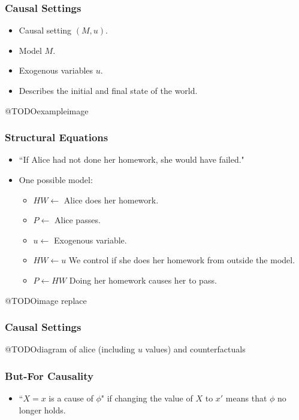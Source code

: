 \documentclass{beamer}
\theoremstyle{plain}
\theoremstyle{definition}
\begin{document}
\begin{frame}
\frametitle{Causal Settings}
\begin{itemize}
\item Causal setting $(M,u)$.
\item Model $M$.
\item Exogenous variables $u$.
\item Describes the initial and final state of the world.

\end{itemize}

@TODOexampleimage


\end{frame}


\begin{frame}
\frametitle{Structural Equations}
\begin{itemize}
\item ``If Alice had not done her homework, she would have failed."
\item One possible model: 
\begin{itemize}
\item $HW \leftarrow$ Alice does her homework.
\item $P \leftarrow$ Alice passes.
\item $u \leftarrow$ Exogenous variable.
\item $HW \leftarrow u$ We control if she does her homework from outside the model.
\item $P \leftarrow HW$ Doing her homework causes her to pass.
\end{itemize}

\end{itemize}

@TODOimage replace
\end{frame}


\begin{frame}
\frametitle{Causal Settings}

@TODOdiagram of alice (including $u$ values) and counterfactuals

\end{frame}


\begin{frame}
\frametitle{But-For Causality}
\begin{itemize}
\item ``$X=x$ is a cause of $\phi$" if changing the value of $X$ to $x'$ means that $\phi$ no longer holds.
\end{itemize}


\end{frame}
\end{document}
